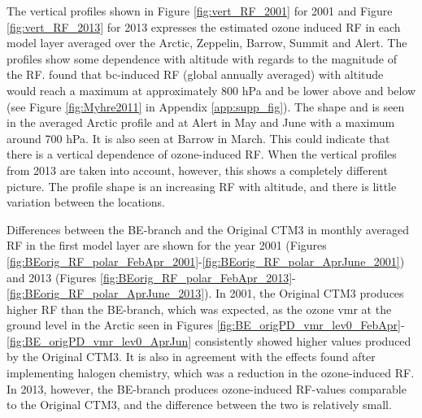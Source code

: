 \medskip

The vertical profiles shown in Figure \ref{fig:vert_RF_2001} for 2001 and Figure \ref{fig:vert_RF_2013} for 2013 expresses the estimated ozone induced RF in each model layer averaged over the Arctic, Zeppelin, Barrow, Summit and Alert. The profiles show some dependence with altitude with regards to the magnitude of the RF. \cite{MYHRE2011387} found that \acrlong{bc}-induced RF (global annually averaged) with altitude would reach a maximum at approximately 800 hPa and be lower above and below (see Figure \ref{fig:Myhre2011} in Appendix \ref{app:supp_fig}). The shape and is seen in the averaged Arctic profile and at Alert in May and June with a maximum around 700 hPa. It is also seen at Barrow in March. This could indicate that there is a vertical dependence of ozone-induced RF. When the vertical profiles from 2013 are taken into account, however, this shows a completely different picture. The profile shape is an increasing RF with altitude, and there is little variation between the locations. 


\medskip

Differences between the BE-branch and the Original CTM3 in monthly averaged RF in the first model layer are shown for the year 2001 (Figures \ref{fig:BEorig_RF_polar_FebApr_2001}-\ref{fig:BEorig_RF_polar_AprJune_2001}) and 2013 (Figures \ref{fig:BEorig_RF_polar_FebApr_2013}-\ref{fig:BEorig_RF_polar_AprJune_2013}). In 2001, the Original CTM3 produces higher RF than the BE-branch, which was expected, as the ozone \acrshort{vmr} at the ground level in the Arctic seen in Figures \ref{fig:BE_origPD_vmr_lev0_FebApr}-\ref{fig:BE_origPD_vmr_lev0_AprJun} consistently showed higher values produced by the Original CTM3. It is also in agreement with the effects \cite{Sherwen2017} found after implementing halogen chemistry, which was a reduction in the ozone-induced RF. In 2013, however, the BE-branch produces ozone-induced RF-values comparable to the Original CTM3, and the difference between the two is relatively small. 

\medskip

